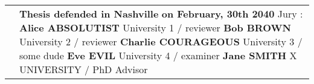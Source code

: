 \documentclass[10pt]{book}
\begin{document}
\begin{titlepage}
\begin{center}
\begin{minipage}{\glarg}
\begin{tabular}{p{7cm}p{10cm}}
\begin{minipage}{\plarg}
\hspace{-1.8cm}{\huge\bf on several lines \dots}\vspace{5mm}

\hspace{-1.8cm}{\huge\bf many lines \dots}\vspace{5mm}



\end{minipage}
&
\begin{minipage}{\plarg}
{\large\bf Thesis defended in Nashville \vspace{1mm}\newline}
{\large\bf on February, 30th 2040\vspace{2mm}\newline}
{\large Jury : \vspace{2mm}\newline}
{\Large\bf Alice ABSOLUTIST \vspace{0mm}\newline}
{ University 1 \!/\! reviewer \vspace{1mm}\newline}
{\Large\bf Bob BROWN \vspace{0mm}\newline}
{ University 2 \!/\! reviewer \vspace{1mm}\newline}
{\Large\bf Charlie COURAGEOUS \vspace{0mm}\newline}
{ University 3 \!/\! some dude \vspace{1mm}\newline}
{\Large\bf Eve EVIL \vspace{0mm}\newline}
{ University 4 \!/\! examiner \vspace{1mm}\newline}
{\Large\bf Jane SMITH \vspace{0mm}\newline}
{X UNIVERSITY \!/\! PhD Advisor}

\end{minipage}
\end{tabular}

\end{minipage}
\end{center}
\end{titlepage}
\end{document}
